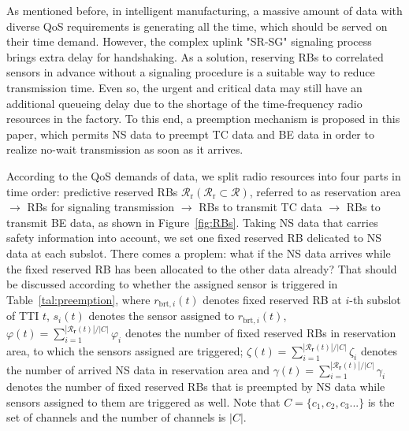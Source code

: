 \documentclass{SCIS2021}
\begin{document}
	\par As mentioned before, in intelligent manufacturing, a massive amount of data with diverse QoS requirements is generating all the time, which should be served on their time demand. However, the complex uplink "SR-SG" signaling process brings extra delay for handshaking. As a solution, reserving RBs to correlated sensors in advance without a signaling procedure is a suitable way to reduce transmission time. {\color{black} Even so, the urgent and critical data may still have an additional queueing delay due to the shortage of the time-frequency radio resources in the factory. To this end, a preemption mechanism is proposed in this paper, which permits NS data to preempt TC data and BE data in order to realize no-wait transmission as soon as it arrives.}
	
	
	
	\par {\color{black}According to the QoS demands of data, we split radio resources into four parts in time order: predictive reserved RBs $\mathcal{R}_{\text{r}} \left(\mathcal{R}_{\text {r}} \subset \mathcal{R}\right)$, referred to as reservation area $ \to$ RBs for signaling transmission $\to$ RBs to transmit TC data $\to$ RBs to transmit BE data, as shown in Figure~\ref{fig:RBs}. Taking NS data that carries safety information into account, we set one fixed reserved RB delicated to NS data at each subslot. }%
	There comes a proplem: what if the NS data arrives while the fixed reserved RB has been allocated to the other data already? {\color{black}That should be discussed according to whether the assigned sensor is triggered in Table~\ref{tal:preemption}, where $r_{\text{brt},i}(t)$ denotes fixed reserved RB at $i$-th subslot of TTI $t$, $s_{i}(t)$ denotes the sensor assigned to $r_{\text{brt},i}(t)$, $\varphi(t)=\sum_{i=1}^{\left|\mathcal{R}_{\mathbf{r}}(t)\right| / \left|C\right|} \varphi_{i}$ denotes the number of fixed reserved RBs in reservation area, to which the sensors assigned are triggered;  $\zeta(t)=\sum_{i=1}^{\left|\mathcal{R}_{\mathbf{r}}(t)\right| / \left|C\right|} \zeta_{i}$ denotes the number of arrived NS data in reservation area and $\gamma(t)=\sum_{i=1}^{\left|\mathcal{R}_{\mathbf{r}}(t)\right| / \left|C\right|} \gamma_{i}$ denotes the number of fixed reserved RBs that is preempted by NS data while sensors assigned to them are triggered as well. Note that $C = \{c_{1},c_{2},c_{3}...\}$ is the set of channels and the number of channels is $|C|$.}
	
\end{document}
